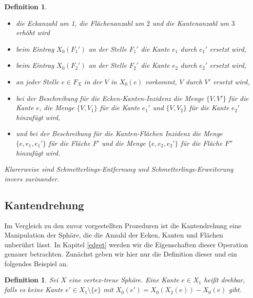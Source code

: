 \documentclass[12pt,titlepage,twoside,cleardoublepage]{article}
\theoremstyle{nummermitklammern}
\newtheorem{definition}[temp]{Definition}
\newtheorem{definition}[zahl]{Definition}
\numberwithin{equation}{section}
\begin{document}
\begin{definition}
 \begin{itemize}
 \item die Eckanzahl um 1, die Flächenanzahl um $2$ und die Kantenanzahl um $3$ erhöht wird 
 \item beim Eintrag $X_0(F_1')$ an der Stelle $F_1'$ die Kante $e_1$ durch $e_1'$ ersetzt wird,
 \item beim Eintrag $X_0(F_2')$ an der Stelle $F_2'$ die Kante $e_2$ durch $e_2'$ ersetzt wird,
 \item an jeder Stelle $e\in F_X$ in der $V$ in $X_0(e)$ vorkommt, $V$ durch $V'$ ersetzt wird, 
\item  bei der Beschreibung  für die Ecken-Kanten-Inzidenz die Menge $\{V,V'\}$ für die Kante $e$, die Menge $\{V,V_1\}$ für die Kante $e_1'$ und $\{V,V_2\}$ für die Kante $e_2'$ hinzufügt wird,
\item und bei der Beschreibung für die Kanten-Flächen Inzidenz  die Menge $\{e,e_1,e_1'\}$ für die Fläche $F'$ und die Menge $\{e,e_2,e_2'\}$ für die Fläche $F''$ hinzufügt wird.
 \end{itemize}
  Klarerweise sind Schmetterlings-Entfernung und Schmetterlings-Erweiterung invers zueinander.
 \end{definition}
\subsection{Kantendrehung}
Im Vergleich zu den zuvor vorgestellten Prozeduren ist die Kantendrehung eine Manipulation der Sphäre, die die Anzahl der Ecken, Kanten und Flächen unberührt lässt. In Kapitel \ref{edget} werden wir die Eigenschaften dieser Operation genauer betrachten. Zunächst geben wir hier nur die Definition dieser und ein folgendes Beispiel an.
\begin{definition}
Sei $X$ eine vertex-treue Sphäre. Eine Kante $e\in X_1$ heißt  \emph{drehbar}, falls es keine Kante $e'\in X_1\setminus \{e\}$ mit $X_0(e')=X_0(X_2(e))-X_0(e)$ gibt.
\end{definition}
\end{document}
